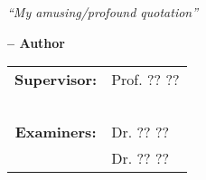 %
%

\clearpage
\thispagestyle{empty}

\begin{center}


\emph{``My amusing/profound quotation''}
\begin{flushright}
{\bf -- Author }
\end{flushright}
\begin{flushright}
\begin{minipage}[c]{6cm}
\begin{tabular}{cl}
{\bf Supervisor:} & Prof. ?? ??\\
~ & ~ \\
{\bf Examiners:} & Dr. ?? ??\\
~ & Dr. ?? ??\\
\end{tabular}
\end{minipage}
\end{flushright}
\end{center}

\clearpage


